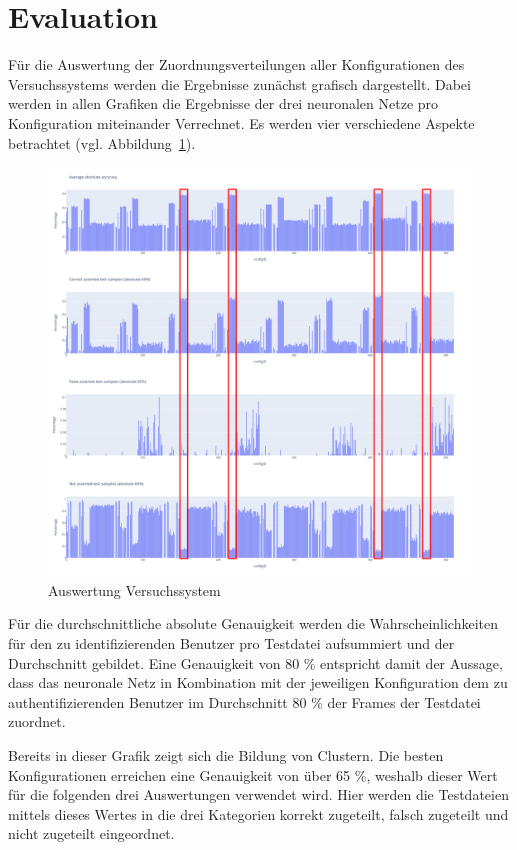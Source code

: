 \section{Evaluation} \label{sec:Evaluation}
Für die Auswertung der Zuordnungsverteilungen aller Konfigurationen des Versuchssystems werden die Ergebnisse zunächst grafisch dargestellt.
Dabei werden in allen Grafiken die Ergebnisse der drei neuronalen Netze pro Konfiguration miteinander Verrechnet.
Es werden vier verschiedene Aspekte betrachtet (vgl. Abbildung~\ref{fig:AuswertungVersuchssystem}).
\begin{figure}[H]
    \centering
    \includegraphics[width=1\textwidth, keepaspectratio]{images/Auswertung.png}
    \caption{Auswertung Versuchssystem}
    \label{fig:AuswertungVersuchssystem}
\end{figure}

Für die durchschnittliche absolute Genauigkeit werden die Wahrscheinlichkeiten für den zu identifizierenden Benutzer pro Testdatei aufsummiert und der Durchschnitt gebildet.
Eine Genauigkeit von 80 \% entspricht damit der Aussage, dass das neuronale Netz in Kombination mit der jeweiligen Konfiguration dem zu authentifizierenden Benutzer im Durchschnitt 80 \% der Frames der Testdatei zuordnet.

Bereits in dieser Grafik zeigt sich die Bildung von Clustern.
Die besten Konfigurationen erreichen eine Genauigkeit von über 65 \%, weshalb dieser Wert für die folgenden drei Auswertungen verwendet wird.
Hier werden die Testdateien mittels dieses Wertes in die drei Kategorien korrekt zugeteilt, falsch zugeteilt und nicht zugeteilt eingeordnet.


